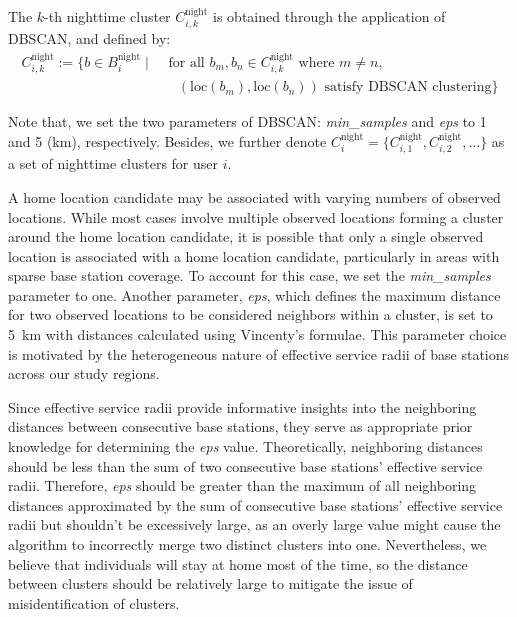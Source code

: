 \begin{definition}
The $k$-th nighttime cluster $C^{\text{night}}_{i, k}$ is obtained through the application of DBSCAN, and defined by:
\begin{align*}
C^{\text{night}}_{i, k}
:=
\{
    b \in B^{\text{night}}_i
    \mid
    &\text{ for all }
        b_m, b_n \in C^{\text{night}}_{i, k}
        \text{ where }
            m \neq n, \\
    &\quad
        (\text{loc}(b_m), \text{loc}(b_n))
        \text{ satisfy DBSCAN clustering}
\}
\end{align*}
\end{definition}


Note that, we set the two parameters of DBSCAN: \textit{min\_samples} and \textit{eps} to 1 and 5 (km), respectively.
Besides, we further denote $C^{\text{night}}_{i} = \{ C^{\text{night}}_{i, 1}, C^{\text{night}}_{i, 2}, \dots \}$ as a set of nighttime clusters for user $i$.

A home location candidate may be associated with varying numbers of observed locations.
While most cases involve multiple observed locations forming a cluster around the home location candidate, it is possible that only a single observed location is associated with a home location candidate, particularly in areas with sparse base station coverage.
To account for this case, we set the \textit{min\_samples} parameter to one.
Another parameter, \textit{eps}, which defines the maximum distance for two observed locations to be considered neighbors within a cluster, is set to 5~km with distances calculated using Vincenty's formulae.
This parameter choice is motivated by the heterogeneous nature of effective service radii of base stations across our study regions.

Since effective service radii provide informative insights into the neighboring distances between consecutive base stations, they serve as appropriate prior knowledge for determining the \textit{eps} value.
Theoretically, neighboring distances should be less than the sum of two consecutive base stations' effective service radii.
Therefore, \textit{eps} should be greater than the maximum of all neighboring distances approximated by the sum of consecutive base stations' effective service radii but shouldn't be excessively large, as an overly large value might cause the algorithm to incorrectly merge two distinct clusters into one.
Nevertheless, we believe that individuals will stay at home most of the time, so the distance between clusters should be relatively large to mitigate the issue of misidentification of clusters.

